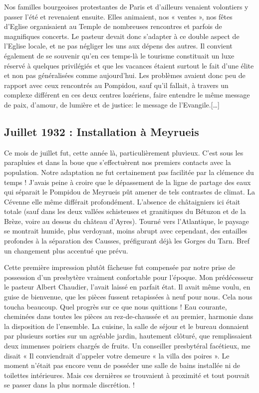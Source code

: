 Nos familles bourgeoises protestantes de Paris et d’ailleurs venaient volontiers y
passer l’été et revenaient ensuite. Elles animaient, nos « ventes », nos fêtes d’Eglise
organisaient au Temple de nombreuses rencontres et parfois de magnifiques concerts.
Le pasteur devait donc s’adapter à ce double aspect de l’Eglise locale, et ne pas
négliger les uns aux dépens des autres. Il convient également de se souvenir qu’en ces temps-là le tourisme constituait un luxe réservé à quelques privilégiés et que les
vacances étaient surtout le fait d’une élite et non pas généralisées comme aujourd’hui.
Les problèmes avaient donc peu de rapport avec ceux rencontrés au Pompidou, sauf
qu’il fallait, à travers un complexe différent en ces deux centres lozériens, faire
entendre le même message de paix, d’amour, de lumière et de justice: le message de
l’Evangile.[\ldots]

\subsection{Juillet 1932 : Installation à Meyrueis}

Ce mois de juillet fut, cette année là, particulièrement pluvieux. C’est sous les
parapluies et dans la boue que s’effectuèrent nos premiers contacts avec la
population. Notre adaptation ne fut certainement pas facilitée par la clémence du
temps ! J’avais peine à croire que le dépassement de la ligne de partage des eaux qui
séparait le Pompidou de Meyrueis pût amener de tels contrastes de climat. La
Cévenne elle même différait profondément. L’absence de châtaigniers ici était totale
(sauf dans les deux vallées schisteuses et granitiques du Bétuzon et de la Brèze, voire au dessus du
château d’Ayres). Tourné vers l’Atlantique, le paysage se montrait humide, plus
verdoyant, moins abrupt avec cependant, des entailles profondes à la séparation des
Causses, préfigurant déjà les Gorges du Tarn. Bref un changement plus accentué que
prévu.

Cette première impression plutôt fâcheuse fut compensée par notre prise de
possession d’un presbytère vraiment confortable pour l’époque.
Mon prédécesseur le pasteur Albert Chaudier, l’avait laissé en parfait état. Il avait
même voulu, en guise de bienvenue, que les pièces fussent retapissées à neuf pour
nous. Cela nous toucha beaucoup. Quel progrès sur ce que nous quittions ! Eau
courante, cheminées dans toutes les pièces au rez-de-chaussée et au premier,
harmonie dans la disposition de l’ensemble. La cuisine, la salle de séjour et le bureau
donnaient par plusieurs sorties sur un agréable jardin, hautement clôturé, que
remplissaient deux immenses poiriers chargés de fruits. Un conseiller presbytéral
facétieux, me disait « Il conviendrait d’appeler votre demeure « la villa des poires ».
Le moment n’était pas encore venu de posséder une salle de bains installée ni de
toilettes intérieures. Mais ces dernières se trouvaient à proximité et tout pouvait se
passer dans la plus normale discrétion. !

